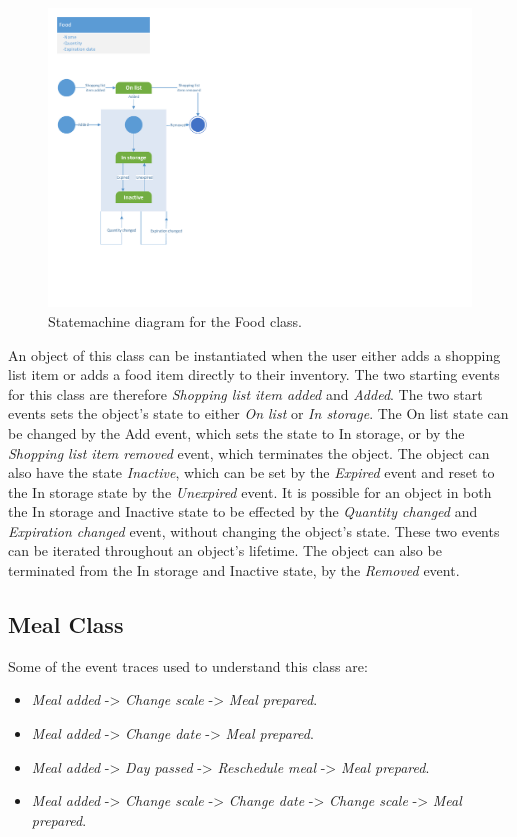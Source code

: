 \begin{figure}[tbhp]
	\centering
	\includegraphics[clip=true, trim=0.5cm 4cm 18.5cm 0.5cm,  ]{Grafik/FoodPlanner/Food.pdf}
	\caption{Statemachine diagram for the Food class.} \label{FoodClass}
\end{figure}
An object of this class can be instantiated when the user either adds a shopping list item or adds a food item directly to their inventory. The two starting events for this class are therefore \textit{Shopping list item added} and \textit{Added}. The two start events sets the object's state to either \textit{On list} or \textit{In storage}. The On list state can be changed by the Add event, which sets the state to In storage, or by the \textit{Shopping list item removed} event, which terminates the object. The object can also have the state \textit{Inactive}, which can be set by the \textit{Expired} event and reset to the In storage state by the \textit{Unexpired} event. It is possible for an object in both the In storage and Inactive state to be effected by the \textit{Quantity changed} and \textit{Expiration changed} event, without changing the object's state. These two events can be iterated throughout an object's lifetime. The object can also be terminated from the In storage and Inactive state, by the \textit{Removed} event.   

\subsection{Meal Class}
Some of the event traces used to understand this class are:
\begin{itemize}
	\item \textit{Meal added} -> \textit{Change scale} -> \textit{Meal prepared}.
	\item \textit{Meal added} -> \textit{Change date} -> \textit{Meal prepared}.
	\item \textit{Meal added} -> \textit{Day passed} ->\textit{ Reschedule meal} -> \textit{Meal prepared}.
	\item \textit{Meal added} -> \textit{Change scale} -> \textit{Change date} -> \textit{Change scale} -> \textit{Meal prepared}.
\end{itemize}

